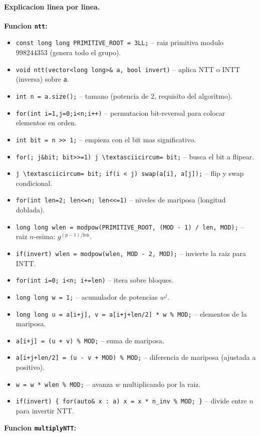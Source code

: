 \paragraph{Explicacion linea por linea.}
\textbf{Funcion \texttt{ntt}:}
\begin{itemize}\setlength\itemsep{0pt}
	\item \verb|const long long PRIMITIVE_ROOT = 3LL;| -- raiz primitiva modulo $998244353$ (genera todo el grupo).
	\item \verb|void ntt(vector<long long>& a, bool invert)| -- aplica NTT o INTT (inversa) sobre \texttt{a}.
	\item \verb|int n = a.size();| -- tamano (potencia de 2, requisito del algoritmo).
	\item \verb|for(int i=1,j=0;i<n;i++)| -- permutacion bit-reversal para colocar elementos en orden.
	\item \verb|int bit = n >> 1;| -- empieza con el bit mas significativo.
	\item \verb|for(; j&bit; bit>>=1) j \textasciicircum= bit;| -- busca el bit a flipear.
	\item \verb|j \textasciicircum= bit; if(i < j) swap(a[i], a[j]);| -- flip y swap condicional.
	\item \verb|for(int len=2; len<=n; len<<=1)| -- niveles de mariposa (longitud doblada).
	\item \verb|long long wlen = modpow(PRIMITIVE_ROOT, (MOD - 1) / len, MOD);| -- raiz $n$-esima: $g^{(p-1)/\text{len}}$.
	\item \verb|if(invert) wlen = modpow(wlen, MOD - 2, MOD);| -- invierte la raiz para INTT.
	\item \verb|for(int i=0; i<n; i+=len)| -- itera sobre bloques.
	\item \verb|long long w = 1;| -- acumulador de potencias $w^j$.
	\item \verb|long long u = a[i+j], v = a[i+j+len/2] * w % MOD;| -- elementos de la mariposa.
	\item \verb|a[i+j] = (u + v) % MOD;| -- suma de mariposa.
	\item \verb|a[i+j+len/2] = (u - v + MOD) % MOD;| -- diferencia de mariposa (ajustada a positivo).
	\item \verb|w = w * wlen % MOD;| -- avanza $w$ multiplicando por la raiz.
	\item \verb|if(invert) { for(auto& x : a) x = x * n_inv % MOD; }| -- divide entre $n$ para invertir NTT.
\end{itemize}
\textbf{Funcion \texttt{multiplyNTT}:}

